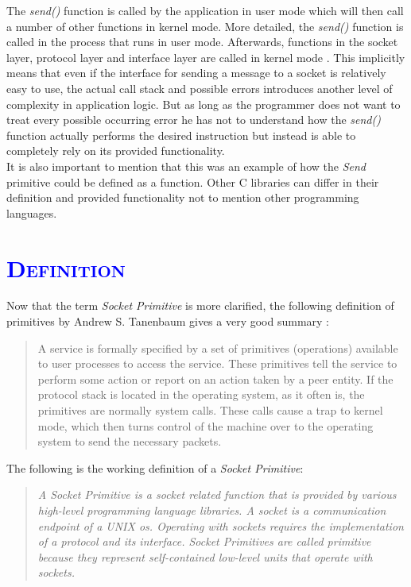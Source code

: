 \documentclass[xcolor=dvipsnames]{article}
\begin{document}
\noindent The \textit{send()} function is called by the application in user mode which will then call a number of other functions in kernel mode. More detailed, the \textit{send()} function is called in the process that runs in user mode. Afterwards, functions in the socket layer, protocol layer and interface layer are called in kernel mode \cite[p. 2, 16]{IBM_Anupama}. This implicitly means that even if the interface for sending a message to a socket is relatively easy to use, the actual call stack and possible errors introduces another level of complexity in application logic. But as long as the programmer does not want to treat every possible occurring error he has not to understand how the \textit{send()} function actually performs the desired instruction but instead is able to completely rely on its provided functionality.\\

\noindent It is also important to mention that this was an example of how the \textit{Send} primitive could be defined as a function. Other C libraries can differ in their definition and provided functionality not to mention other programming languages.

\section{\scshape{\textcolor{blue}{Definition}}} \label{definition}

Now that the term \textit{Socket Primitive} is more clarified, the following definition of primitives by Andrew S. Tanenbaum gives a very good summary \cite[p. 38, ch. 1.3.4]{computer_networks}:

\begin{quote}
A service is formally specified by a set of primitives (operations) available to user processes to access the service. These primitives tell the service to perform some action or report on an action taken by a peer entity. If the protocol stack is located in the operating system, as it often is, the primitives are normally system calls. These calls cause a trap to kernel mode, which then turns control of the machine over to the operating system to send the necessary packets.
\end{quote}

\noindent The following is the working definition of a \textit{Socket Primitive}:

\begin{quote}

\textit{A \textit{Socket Primitive} is a socket related function that is provided by various high-level programming language libraries. A socket is a communication endpoint of a UNIX \gls{os}. Operating with sockets requires the implementation of a protocol and its interface. Socket Primitives are called primitive because they represent self-contained low-level units that operate with sockets.}

\end{quote}
\end{document}
